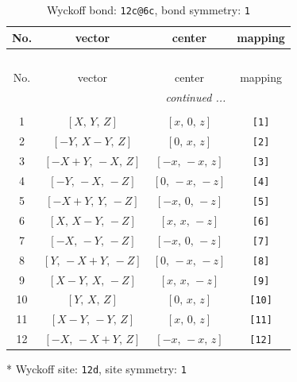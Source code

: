\documentclass[fleqn,8pt]{jsarticle}
\begin{document}
\begin{longtable}{cccc}
\caption{Wyckoff bond: {\tt 12c@6c}, bond symmetry: {\tt 1}}
 \\
 \hline \hline
No. & vector & center & mapping \\ \hline \endfirsthead

\multicolumn{3}{l}{\tablename\ \thetable{}} \\
 \hline \hline
No. & vector & center & mapping \\ \hline \endhead

 \hline \hline
\multicolumn{3}{r}{\footnotesize\it continued ...} \\ \endfoot

 \hline \hline
\multicolumn{3}{r}{} \\ \endlastfoot

1 & $\left[ X,\, Y,\, Z \right]$ & $\left[ x,\, 0,\, z \right]$ & {\tt [1]} \\ \hline
2 & $\left[ - Y,\, X - Y,\, Z \right]$ & $\left[ 0,\, x,\, z \right]$ & {\tt [2]} \\ \hline
3 & $\left[ - X + Y,\, - X,\, Z \right]$ & $\left[ - x,\, - x,\, z \right]$ & {\tt [3]} \\ \hline
4 & $\left[ - Y,\, - X,\, - Z \right]$ & $\left[ 0,\, - x,\, - z \right]$ & {\tt [4]} \\ \hline
5 & $\left[ - X + Y,\, Y,\, - Z \right]$ & $\left[ - x,\, 0,\, - z \right]$ & {\tt [5]} \\ \hline
6 & $\left[ X,\, X - Y,\, - Z \right]$ & $\left[ x,\, x,\, - z \right]$ & {\tt [6]} \\ \hline
7 & $\left[ - X,\, - Y,\, - Z \right]$ & $\left[ - x,\, 0,\, - z \right]$ & {\tt [7]} \\ \hline
8 & $\left[ Y,\, - X + Y,\, - Z \right]$ & $\left[ 0,\, - x,\, - z \right]$ & {\tt [8]} \\ \hline
9 & $\left[ X - Y,\, X,\, - Z \right]$ & $\left[ x,\, x,\, - z \right]$ & {\tt [9]} \\ \hline
10 & $\left[ Y,\, X,\, Z \right]$ & $\left[ 0,\, x,\, z \right]$ & {\tt [10]} \\ \hline
11 & $\left[ X - Y,\, - Y,\, Z \right]$ & $\left[ x,\, 0,\, z \right]$ & {\tt [11]} \\ \hline
12 & $\left[ - X,\, - X + Y,\, Z \right]$ & $\left[ - x,\, - x,\, z \right]$ & {\tt [12]} \\
\end{longtable}
* Wyckoff site: {\tt 12d}, site symmetry: {\tt 1}
\renewcommand{\arraystretch}{1.2}
\end{document}
